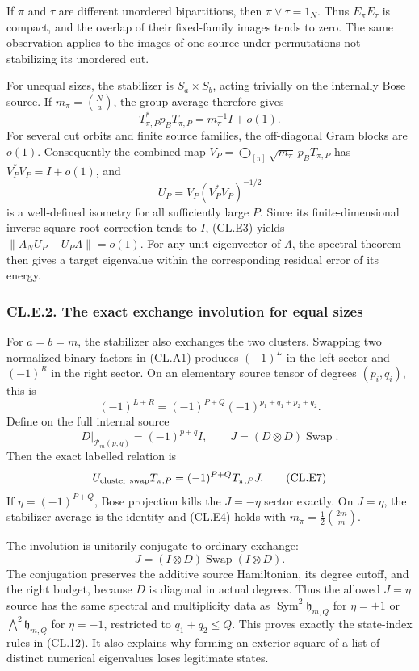 \documentclass[a4paper,11pt]{article}
\numberwithin{equation}{section}
\begin{document}
If \(\pi\) and \(\tau\) are different unordered bipartitions, then \(\pi\vee\tau=1_N\). Thus \(E_\pi E_\tau\) is compact, and the overlap of their fixed-family images tends to zero. The same observation applies to the images of one source under permutations not stabilizing its unordered cut.

For unequal sizes, the stabilizer is \(S_a\times S_b\), acting trivially on the internally Bose source. If \(m_\pi=\binom Na\), the group average therefore gives \[
T_{\pi,P}^*p_BT_{\pi,P}=m_\pi^{-1}I+o(1).
\tag{CL.E4}
\] For several cut orbits and finite source families, the off-diagonal Gram blocks are \(o(1)\). Consequently the combined map \(V_P=\bigoplus_{[\pi]}\sqrt{m_\pi}\,p_BT_{\pi,P}\) has \(V_P^*V_P=I+o(1)\), and \[
U_P=V_P(V_P^*V_P)^{-1/2}
\tag{CL.E5}
\] is a well-defined isometry for all sufficiently large \(P\). Since its finite-dimensional inverse-square-root correction tends to \(I\), (CL.E3) yields \(\|A_NU_P-U_P\Lambda\|=o(1)\). For any unit eigenvector of \(\Lambda\), the spectral theorem then gives a target eigenvalue within the corresponding residual error of its energy.

\hypertarget{cl.e.2.-the-exact-exchange-involution-for-equal-sizes}{%
\subsubsection{CL.E.2. The exact exchange involution for equal sizes}\label{cl.e.2.-the-exact-exchange-involution-for-equal-sizes}}

For \(a=b=m\), the stabilizer also exchanges the two clusters. Swapping two normalized binary factors in (CL.A1) produces \((-1)^L\) in the left sector and \((-1)^R\) in the right sector. On an elementary source tensor of degrees \((p_i,q_i)\), this is \[
(-1)^{L+R}=(-1)^{P+Q}(-1)^{p_1+q_1+p_2+q_2}.
\] Define on the full internal source \[
D|_{\mathcal P_m(p,q)}=(-1)^{p+q}I,\qquad
J=(D\otimes D)\operatorname{Swap}.
\tag{CL.E6}
\] Then the exact labelled relation is \[
U_{\rm cluster\ swap}T_{\pi,P}
=(-1)^{P+Q}T_{\pi,P}J.
\tag{CL.E7}
\] If \(\eta=(-1)^{P+Q}\), Bose projection kills the \(J=-\eta\) sector exactly. On \(J=\eta\), the stabilizer average is the identity and (CL.E4) holds with \(m_\pi=\frac12\binom{2m}{m}\).

The involution is unitarily conjugate to ordinary exchange: \[
J=(I\otimes D)\operatorname{Swap}(I\otimes D).
\tag{CL.E8}
\] The conjugation preserves the additive source Hamiltonian, its degree cutoff, and the right budget, because \(D\) is diagonal in actual degrees. Thus the allowed \(J=\eta\) source has the same spectral and multiplicity data as \(\operatorname{Sym}^2\mathfrak h_{m,Q}\) for \(\eta=+1\) or \(\bigwedge^2\mathfrak h_{m,Q}\) for \(\eta=-1\), restricted to \(q_1+q_2\leq Q\). This proves exactly the state-index rules in (CL.12). It also explains why forming an exterior square of a list of distinct numerical eigenvalues loses legitimate states.
\end{document}
